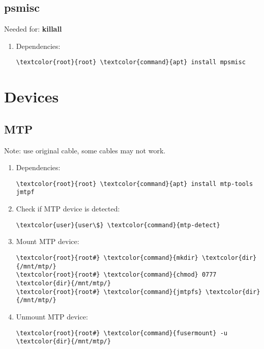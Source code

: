 \documentclass[10pt, a4paper, onecolumn, openany]{book} %
\begin{document}
\subsection{psmisc}
Needed for: \textbf{killall}
\begin{enumerate}
    \item Dependencies:
\begin{Verbatim}[commandchars=\\\{\}]
\textcolor{root}{root} \textcolor{command}{apt} install mpsmisc
\end{Verbatim}
\end{enumerate}
\section{Devices}
\subsection{MTP}
Note: use original cable, some cables may not work.
\begin{enumerate}
    \item Dependencies:
\begin{Verbatim}[commandchars=\\\{\}]
\textcolor{root}{root} \textcolor{command}{apt} install mtp-tools jmtpf
\end{Verbatim}
    \item Check if MTP device is detected:
\begin{Verbatim}[commandchars=\\\{\}]
\textcolor{user}{user\$} \textcolor{command}{mtp-detect}
\end{Verbatim}
    \item Mount MTP device:
\begin{Verbatim}[commandchars=\\\{\}]
\textcolor{root}{root#} \textcolor{command}{mkdir} \textcolor{dir}{/mnt/mtp/}
\textcolor{root}{root#} \textcolor{command}{chmod} 0777 \textcolor{dir}{/mnt/mtp/}
\textcolor{root}{root#} \textcolor{command}{jmtpfs} \textcolor{dir}{/mnt/mtp/}
\end{Verbatim}
    \item Unmount MTP device:
\begin{Verbatim}[commandchars=\\\{\}]
\textcolor{root}{root#} \textcolor{command}{fusermount} -u \textcolor{dir}{/mnt/mtp/}
\end{Verbatim}
\end{enumerate}
\end{document}
